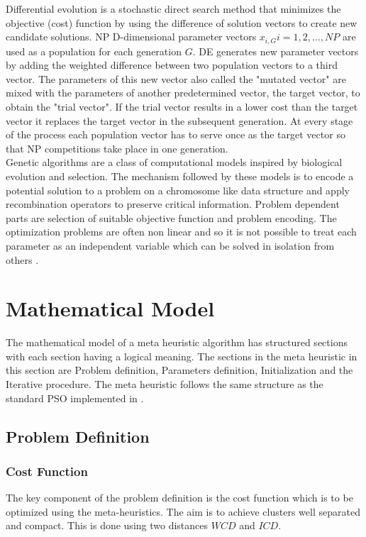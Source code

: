 \documentclass[conference]{IEEEtran}
\begin{document}
Differential evolution \cite{da} is a stochastic direct search method that minimizes the objective (cost) function  by using the difference of solution vectors to create new candidate solutions. NP D-dimensional parameter vectors $x_{i,G} i = 1, 2, ..., NP$ are used as a population for each generation $G$. DE generates new parameter
vectors by adding the weighted difference between two population vectors to a
third vector. The parameters of this new vector also called the "mutated vector" are mixed with the parameters of another predetermined vector, the target
vector, to obtain the "trial vector". If the
trial vector results in a lower cost than the target vector it
replaces the target vector in the subsequent generation. At every stage of the process each population vector has to serve once as the target vector so that NP
competitions take place in one generation. \\

Genetic algorithms are a class of computational models inspired by biological evolution and selection. The mechanism followed by these models is to encode a potential solution to a problem on a chromosome like data structure and apply recombination operators to preserve critical information. Problem dependent parts are selection of suitable objective function and problem encoding. The optimization problems are often non linear and so it is not possible to treat each parameter as an independent variable which can be solved in isolation from others \cite{ga}. 

\section{Mathematical Model}
   
The mathematical model of a meta heuristic algorithm has structured sections with each section having a logical meaning. The sections in the meta heuristic in this section are Problem definition, Parameters definition, Initialization and the Iterative procedure. The meta heuristic follows the same structure as the standard PSO implemented in \cite{pso1} \cite{pso2}.

\subsection{Problem Definition}

\subsubsection{Cost Function} 
The key component of the problem definition is the cost function which is to be optimized using the meta-heuristics. The aim is to achieve clusters well separated and compact. This is done using two distances $WCD$ and $ICD$. 
\end{document}
